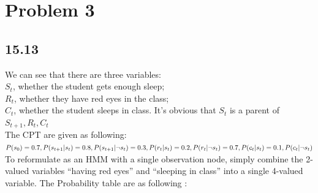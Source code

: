 \documentclass[a4paper,left=2.5cm,right=2.5cm,11pt]{article}
\begin{document}
\section*{Problem 3}
\subsection*{15.13}
We can see that there are three variables: \\ $S_t$, whether the student gets enough sleep; \\ $R_t$, whether they have red eyes in the class; \\ $C_t$, whether the student sleeps in class. It's obvious that $S_t$ is a parent of $S_{t+1}, R_t, C_t $  \\
The CPT are given as following:\\
$P(s_0) = 0.7 , P(s_{t+1}|s_t) = 0.8, P(s_{t+1}| \lnot s_t) = 0.3, \\
P(r_t|s_t) =0.2, P(r_t|\lnot s_t) = 0.7 ,\\ P(c_t|s_t) = 0.1, P(c_t|\lnot s_t)\\$
To reformulate as an HMM with a single observation node, simply combine the 2-valued variables “having red eyes” and “sleeping in class” into a single 4-valued variable. The Probability table are as following :
\end{document}

